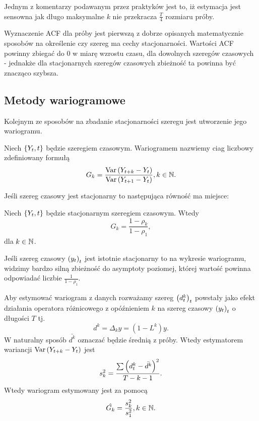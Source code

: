 \documentclass[10pt,a4paper]{book}
\begin{document}
Jednym z komentarzy podawanym przez praktyków jest to, iż estymacja jest sensowna jak długo maksymalne $k$ nie przekracza $\frac{T}{4}$ rozmiaru próby.

\begin{remark}
Wyznaczenie ACF dla próby jest pierwszą z dobrze opisanych matematycznie sposobów na określenie czy szereg ma cechy stacjonarności. Wartości ACF powinny zbiegać do $0$ w miarę wzrostu czasu, dla dowolnych szeregów czasowych - jednakże dla stacjonarnych szeregów czasowych zbieżność ta powinna być znacząco szybsza.
\end{remark}

\subsection{Metody wariogramowe}
Kolejnym ze sposobów na zbadanie stacjonarności szeregu jest utworzenie jego wariogramu. 

\begin{definition}[Wariogram]
Niech $\left\lbrace {{Y_t}, {t}} \right\rbrace$ będzie szeregiem czasowym. Wariogramem nazwiemy ciag liczbowy zdefiniowany formułą
$$
G_k = \frac{\operatorname{Var} \left( {Y_{t+k} - Y_{t}} \right)}{ \operatorname{Var} \left( {Y_{t+1} - Y_t } \right)}, k \in \mathbb{N}.
$$
\end{definition}

Jeśli szereg czasowy jest stacjonarny to następująca równość ma miejsce:

\begin{proposition}
Niech $\left\lbrace {{Y_t}, {t}} \right\rbrace$ będzie stacjonarnym szeregiem czasowym. Wtedy 
$$
G_k = \frac{1-\rho_k}{1-\rho_1},
$$
dla $k \in \mathbb{N}$.
\end{proposition}
Jeśli szereg czasowy $\left( {y_t} \right)_{t}^{} $ jest istotnie stacjonarny to na wykresie wariogramu, widzimy bardzo silną zbieżność do asymptoty poziomej, której wartość powinna odpowiadać liczbie $\frac{1}{1-\rho_1}$.
\begin{definition}
 Aby estymować wariogram z danych rozważamy szereg $\left( {d^k_t} \right)_{t}^{} $ powstały jako efekt działania operatora różnicowego z opóźnieniem $k$ na szereg czasowy $\left( {y_t} \right)_{t}^{} $ o długości $T$ tj.
$$
d^k = \Delta_k y = (1- L^k) y.
$$ 
W naturalny sposób $\bar{d^k}$ oznaczać będzie średnią z próby. Wtedy estymatorem wariancji $\operatorname{Var} \left( {Y_{t+k} - Y_t} \right)$ jest 
$$
s_k^2 = \frac{ \sum \bracket{d^k_t - \bar{d^k}}^2  }{T-k-1}.
$$
Wtedy wariogram estymowany jest za pomocą 
$$
\hat{G_k} = \frac{s_k^2}{s_1^2}, k \in \mathbb{N}.
$$
\end{definition}
\end{document}
